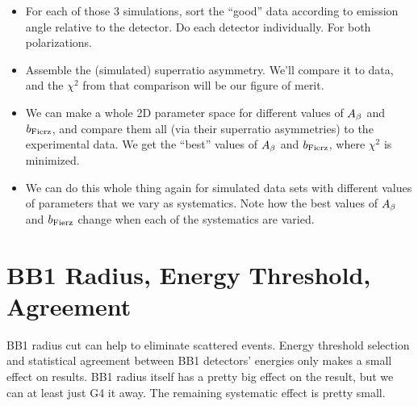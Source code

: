 \begin{itemize}
	\item For each of those 3 simulations, sort the ``good'' data according to emission angle relative to the detector.  Do each detector individually.  For both polarizations.
	\item Assemble the (simulated) superratio asymmetry.  We'll compare it to data, and the $\chi^2$ from that comparison will be our figure of merit.  
	\item We can make a whole 2D parameter space for different values of $A_{\beta}$ and $b_{\mathrm{Fierz}}$, and compare them all (via their superratio asymmetries) to the experimental data.  We get the ``best'' values of $A_{\beta}$ and $b_{\mathrm{Fierz}}$, where $\chi^2$ is minimized.
	\item We can do this whole thing again for simulated data sets with different values of parameters that we vary as systematics.  Note how the best values of $A_{\beta}$ and $b_{\mathrm{Fierz}}$ change when each of the systematics are varied.
\end{itemize}



\FloatBarrier
\section{BB1 Radius, Energy Threshold, Agreement}
\label{section:bb1_systematics}
BB1 radius cut can help to eliminate scattered events.  Energy threshold selection and statistical agreement between BB1 detectors' energies only makes a small effect on results.  BB1 radius itself has a pretty big effect on the result, but we can at least just G4 it away.  The remaining systematic effect is pretty small.  
	

